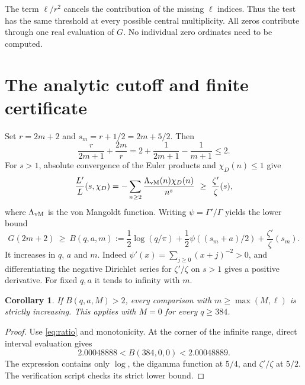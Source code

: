 \documentclass[11pt]{article}
\newtheorem{corollary}[theorem]{Corollary}
\numberwithin{equation}{section}
\begin{document}
The term $\ell/r^2$ cancels the contribution of the missing $\ell$ indices. Thus the test has the same threshold at every possible central multiplicity. All zeros contribute through one real evaluation of $G$. No individual zero ordinates need to be computed.

\section{The analytic cutoff and finite certificate}
Set $r=2m+2$ and $s_m=r+1/2=2m+5/2$. Then
\[
 \frac{r}{2m+1}+\frac{2m}{r}
 =2+\frac{1}{2m+1}-\frac{1}{m+1}\le2.
\]
For $s>1$, absolute convergence of the Euler products and $\chi_D(n)\le1$ give
\[
 \frac{L'}{L}(s,\chi_D)
 =-\sum_{n\ge2}\frac{\Lambda_{\rm vM}(n)\chi_D(n)}{n^s}
 \ \ge\ \frac{\zeta'}{\zeta}(s),
\]
where $\Lambda_{\rm vM}$ is the von Mangoldt function. Writing $\psi=\Gamma'/\Gamma$ yields the lower bound
\begin{equation}\label{eq:cut}
 G(2m+2)\ \ge\ B(q,a,m):=
 \frac12\log(q/\pi)+\frac12\psi((s_m+a)/2)
       +\frac{\zeta'}{\zeta}(s_m).
\end{equation}
It increases in $q$, $a$ and $m$. Indeed $\psi'(x)=\sum_{j\ge0}(x+j)^{-2}>0$, and differentiating the negative Dirichlet series for $\zeta'/\zeta$ on $s>1$ gives a positive derivative. For fixed $q,a$ it tends to infinity with $m$.

\begin{corollary}
If $B(q,a,M)>2$, every comparison with $m\ge\max(M,\ell)$ is strictly increasing. This applies with $M=0$ for every $q\ge384$.
\end{corollary}
\begin{proof}
Use \eqref{eq:ratio} and monotonicity. At the corner of the infinite range, direct interval evaluation gives
\[
 2.00048888<B(384,0,0)<2.00048889 .
\]
The expression contains only $\log$, the digamma function at $5/4$, and $\zeta'/\zeta$ at $5/2$. The verification script checks its strict lower bound.
\end{proof}
\end{document}

